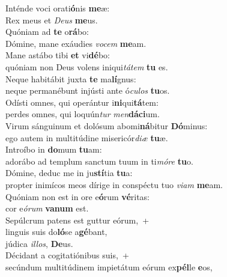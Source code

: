\evenverse Inténde voci orati\textbf{ó}nis \textbf{me}æ:~\*\\
\evenverse Rex meus et \textit{De}\textit{us} \textbf{me}us.\\
\oddverse Quóniam ad \textbf{te} o\textbf{rá}bo:~\*\\
\oddverse Dómine, mane exáudies \textit{vo}\textit{cem} \textbf{me}am.\\
\evenverse Mane astábo tibi \textbf{et} vi\textbf{dé}bo:~\*\\
\evenverse quóniam non Deus volens iniqui\textit{tá}\textit{tem} \textbf{tu} es.\\
\oddverse Neque habitábit juxta \textbf{te} ma\textbf{lí}gnus:~\*\\
\oddverse neque permanébunt injústi ante ó\textit{cu}\textit{los} \textbf{tu}os.\\
\evenverse Odísti omnes, qui operántur i\textbf{ni}qui\textbf{tá}tem:~\*\\
\evenverse perdes omnes, qui loquún\textit{tur} \textit{men}\textbf{dá}\textbf{ci}um.\\
\oddverse Virum sánguinum et dolósum abomi\textbf{ná}bitur \textbf{Dó}minus:~\*\\
\oddverse ego autem in multitúdine misericór\textit{di}\textit{æ} \textbf{tu}æ.\\
\evenverse Introíbo in \textbf{do}mum \textbf{tu}am:~\*\\
\evenverse adorábo ad templum sanctum tuum in ti\textit{mó}\textit{re} \textbf{tu}o.\\
\oddverse Dómine, deduc me in ju\textbf{stí}tia \textbf{tu}a:~\*\\
\oddverse propter inimícos meos dírige in conspéctu tuo \textit{vi}\textit{am} \textbf{me}am.\\
\evenverse Quóniam non est in ore e\textbf{ó}rum \textbf{vé}ritas:~\*\\
\evenverse cor e\textit{ó}\textit{rum} \textbf{va}\textbf{num} est.\\
\oddverse Sepúlcrum patens est guttur eórum,~+\\
\oddverse  linguis suis do\textbf{ló}se a\textbf{gé}bant,~\*\\
\oddverse júdica \textit{il}\textit{los}, \textbf{De}us.\\
\evenverse Décidant a cogitatiónibus suis,~+\\
\evenverse  secúndum multitúdinem impietátum eórum ex\textbf{pél}le \textbf{e}os,~\*\\

